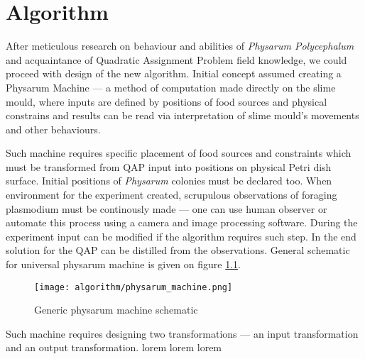 \chapter{Algorithm}
\label{chapter:algorithm}

After meticulous research on behaviour and abilities of \textit{Physarum Polycephalum} and acquaintance of Quadratic Assignment Problem field knowledge, we could proceed with design of the new algorithm. Initial concept assumed creating a Physarum Machine --- a method of computation made directly on the slime mould, where inputs are defined by positions of food sources and physical constrains and results can be read via interpretation of slime mould's movements and other behaviours.

Such machine requires specific placement of food sources and constraints which must be transformed from QAP input into positions on physical Petri dish surface. Initial positions of \textit{Physarum} colonies must be declared too. When environment for the experiment created, scrupulous observations of foraging plasmodium must be continously made --- one can use human observer or automate this process using a camera and image processing software. During the experiment input can be modified if the algorithm requires such step. In the end solution for the QAP can be distilled from the observations. General schematic for universal physarum machine is given on figure \ref{figure:a_machine}.

\begin{figure}
  \centering
  \texttt{[image: algorithm/physarum\_machine.png]}
  \caption{Generic physarum machine schematic}
  \label{figure:a_machine}
\end{figure}

Such machine requires designing two transformations --- an input transformation and an output transformation. lorem lorem lorem





